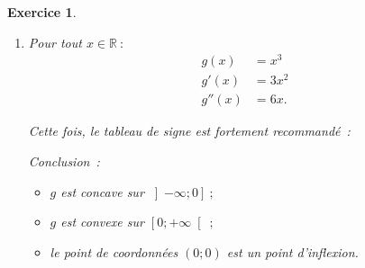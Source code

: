 \documentclass[10pt]{article}
\newtheorem{exo}{Exercice}
\begin{document}
\begin{exo}
\begin{enumerate}
\item Pour tout $x\in\mathbb{R}~:$
\begin{align*}
g(x)&=x^3\\
g'(x)&=3x^2\\
g''(x)&=6x.
\end{align*}

\medskip

Cette fois, le tableau de signe est fortement recommandé~:


\begin{center}
\hspace*{-1cm}
\end{center}

Conclusion~:

\begin{itemize}
\item[\textbullet] $g$ est concave sur $\left]-\infty;0\right]~;$
\item[\textbullet] $g$ est convexe sur $\left[0;+\infty\right[~;$
\item[\textbullet] le point de coordonnées $(0;0)$ est un point d'inflexion.
\end{itemize}

\medskip



\end{enumerate}
\end{exo}
\end{document}
